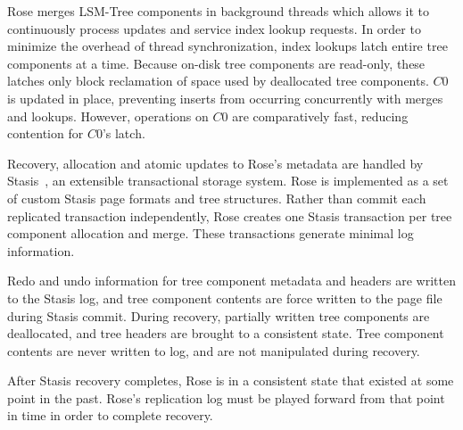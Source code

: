 \documentclass{vldb}
\newcommand{\rows}{Rose\xspace}
\newcommand{\rowss}{Rose's\xspace}
\begin{document}

\rows merges LSM-Tree components in background threads which allows
it to continuously process updates and service index lookup requests.
In order to minimize the overhead of thread synchronization, index
lookups latch entire tree components at a time.  Because on-disk tree
components are read-only, these latches only block reclamation of
space used by deallocated tree components.  $C0$ is
updated in place, preventing inserts from occurring concurrently with
merges and lookups.  However, operations on $C0$ are comparatively
fast, reducing contention for $C0$'s latch.

Recovery, allocation and atomic updates to \rowss metadata are
handled by Stasis~\cite{stasis}, an extensible transactional storage
system.  \rows is implemented as a set of custom Stasis page formats
and tree structures.  Rather than commit each replicated transaction
independently, \rows creates one Stasis transaction per tree component
allocation and merge.  These transactions generate minimal log
information.

Redo and undo information for tree component metadata and headers are
written to the Stasis log, and tree component contents are force
written to the page file during Stasis commit.  During recovery,
partially written tree components are deallocated, and tree headers
are brought to a consistent state.  Tree component contents are never
written to log, and are not manipulated during recovery.

After Stasis recovery completes, \rows is in a consistent state that
existed at some point in the past.  \rowss replication log must be
played forward from that point in time in order to complete recovery.

\end{document}
